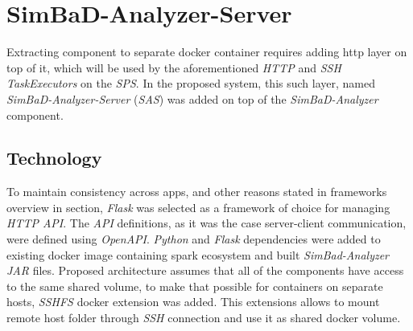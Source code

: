 \section{SimBaD-Analyzer-Server}
Extracting component to separate docker container requires adding http layer on top of it, which will be used by the aforementioned \textit{HTTP} and \textit{SSH} \textit{TaskExecutors} on the \textit{SPS}. In the proposed system, this such layer, named \textit{SimBaD-Analyzer-Server} (\textit{SAS}) was added on top of the \textit{SimBaD-Analyzer} component. 
\subsection{Technology}
To maintain consistency across apps, and other reasons stated in frameworks overview in section, \textit{Flask} was selected as a framework of choice for managing \textit{HTTP API}. The \textit{API} definitions, as it was the case server-client communication, were defined using \textit{OpenAPI}. \textit{Python} and \textit{Flask} dependencies were added to existing docker image containing spark ecosystem and built \textit{SimBad-Analyzer} \textit{JAR} files. Proposed architecture assumes that all of the components have access to the same shared volume, to make that possible for containers on separate hosts, \textit{SSHFS} docker extension was added. This extensions allows to mount remote host folder through \textit{SSH} connection and use it as shared docker volume.
